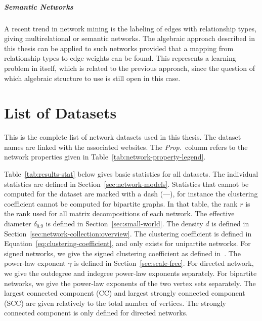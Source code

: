 \documentclass[11pt,a4paper]{book}
\begin{document}
\paragraph{Semantic Networks}
A recent trend in network mining is the labeling of edges with
relationship types, giving multirelational or semantic networks.  The
algebraic approach described in this thesis can be applied to such
networks provided that a mapping from relationship types to edge weights
can be found.  This represents a learning problem in itself, which
is related to the previous approach, since the question of
which algebraic structure to use is still open in this case. 

\appendix 

\chapter{List of Datasets}
\label{chap:datasets}

This is the complete list of network datasets used in this thesis.  
\ifdefined\printversion 
\else
  The dataset names are linked with the associated websites. 
\fi
The \emph{Prop.}\ column refers to the network properties given in
Table~\ref{tab:network-property-legend}. 
\ifdefined\printversion
  \vspace{\baselineskip} %
\fi

{
  \fontsize{6.0}{6.0}\selectfont
  \setlength{\tabcolsep}{1pt}
  
}

\clearpage

Table~\ref{tab:results-stat} below gives basic statistics for all datasets.  
The individual statistics are defined in
Section~\ref{sec:network-models}.  
Statistics that cannot be computed for the dataset are marked with a
dash (---), for instance the clustering coefficient cannot be computed
for bipartite graphs. 
In that table, the rank $r$ is the rank used for all matrix
decompositions of each network. 
The effective diameter $\delta_{0.9}$ is defined in
Section~\ref{sec:small-world}. 
The density $d$ is defined in
Section~\ref{sec:network-collection:overview}. 
The clustering coefficient is defined in
Equation~\ref{eq:clustering-coefficient}, and only exists for unipartite
networks.
For signed networks, we give the signed clustering coefficient as
defined in~\cite{kunegis:slashdot-zoo}. 
The power-law exponent $\gamma$ is defined in
Section~\ref{sec:scale-free}. For directed network, we give the
outdegree and indegree power-law exponents separately.  For bipartite
networks, we give the power-law exponents of the two vertex sets
separately. 
The largest connected component (CC) and largest strongly connected
component (SCC) are given relatively to the total number of vertices.
The strongly connected component is only defined for directed networks. 
\end{document}
